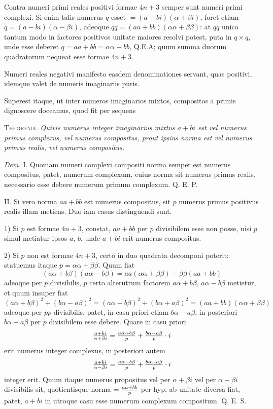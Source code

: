 \documentclass[twoside,12pt, showframe]{memoir}
\let\oldfrac\frac
\def\frac#1#2{\mathchoice{\tfrac{#1}{#2}}{\oldfrac{#1}{#2}}{\genfrac{}{}{}{2}{#1}{#2\mathstrut}}{\genfrac{}{}{}{3}{#1}{#2\mathstrut}}}
\begin{document}
Contra numeri primi reales positivi formae \(4 n+3\) semper sunt numeri primi complexi. Si enim talis numerus \(q\) esset \(=(a+b i)(\alpha+\beta i)\), foret etiam \(q=(a-b i)(\alpha-\beta i)\), adeoque \(q q=(a a+b b)(\alpha \alpha+\beta \beta)\): at \(q q\) unico tantum modo in factores positivos unitate maiores resolvi potest, puta in \(q \times q\), unde esse deberet \(q=a a+b b=\alpha \alpha+b b\), Q.E.A; quum summa duorum quadratorum nequeat esse formae \(4 n+3\).\clearpage\noindent%

Numeri reales negativi manifesto easdem denominationes servant, quas positivi, idemque valet de numeris imaginariis puris.
 
Superest itaque, ut inter numeros imaginarios mixtos, compositos a primis dignoscere doceamus, quod fit per sequens
 
\textsc{Theorema.} \textit{Quivis numerus integer imaginarius mixtus \(a+b i\) est vel numerus primus complexus, vel numerus compositus, prout ipsius norma est vel numerus primus realis, vel numerus compositus.}
 
\textit{Dem.} I. Quoniam numeri complexi compositi norma semper est numerus compositus, patet, numerum complexum, cuius norma sit numerus primus realis, necessario esse debere numerum primum complexum. Q. E. P.
 
II. Si vero norma \(a a+b b\) est numerus compositus, sit \(p\) numerus primus positivus realis illam metiens. Duo iam casus distinguendi sunt.
 
1) Si \(p\) est formae \(4 n+3\), constat, \(a a+b b\) per \(p\) divisibilem esse non posse, nisi \(p\) simul metiatur ipsos \(a\), \(b\), unde \(a+b i\) erit numerus compositus.
 
2) Si \(p\) non est formae \(4 n+3\), certo in duo quadrata decomponi poterit: statuemus itaque \(p=\alpha \alpha+\beta \beta\). Quum fiat
\[(a \alpha+b \beta)(a \alpha-b \beta)=a a(\alpha \alpha+\beta \beta)-\beta \beta(a a+b b)\]
adeoque per \(p\) divisibilis, \(p\) certo alterutrum factorem \(a \alpha+b \beta\), \(a \alpha-b \beta\) metietur, et quum insuper fiat
\[(a \alpha+b \beta)^{2}+(b \alpha-a \beta)^{2}=(a \alpha-b \beta)^{2}+(b \alpha+a \beta)^{2}=(a a+b b)(\alpha \alpha+\beta \beta)\]
adeoque per \(p p\) divisibilis, patet, in casu priori etiam \(b \alpha-a \beta\), in posteriori \(b \alpha+a \beta\) per \(p\) divisibilem esse debere. Quare in casu priori
\[\frac{a+b i}{\alpha+\beta i}=\frac{a \alpha+b \beta}{p}+\frac{b \alpha-a \beta}{p} \cdot i\]
erit numerus integer complexus, in posteriori autem
\[\frac{a+b i}{\alpha-\beta i}=\frac{a \alpha-b \beta}{p}+\frac{b \alpha+a \beta}{p} \cdot i\]
integer erit. Quum itaque numerus propositus vel per \(\alpha+\beta i\) vel per \(\alpha-\beta i\) divisibilis sit, quotientisque norma \(=\frac{a a+b b}{p}\) per hyp. ab unitate diversa fiat, patet, \(a+b i\) in utroque casu esse numerum complexum compositum. Q. E. S.\clearpage\noindent%
\end{document}
